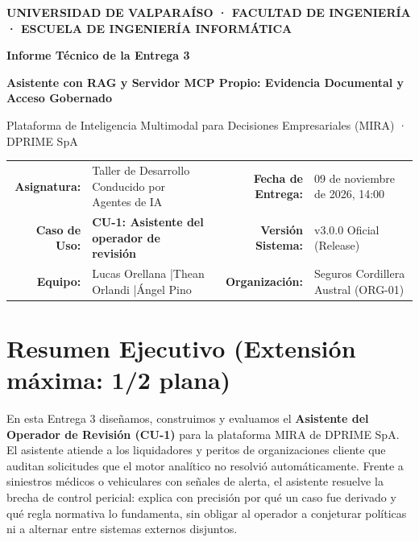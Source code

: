 \documentclass[11pt,letterpaper]{article}
\begin{document}
\begin{center}
    {\small\textbf{\color{gray}UNIVERSIDAD DE VALPARAÍSO · FACULTAD DE INGENIERÍA · ESCUELA DE INGENIERÍA INFORMÁTICA}\par}
    \vspace{0.2cm}
    {\Large\bfseries\color{dprimeblue}Informe Técnico de la Entrega 3\par}
    \vspace{0.1cm}
    {\large\bfseries\color{indigoaccent}Asistente con RAG y Servidor MCP Propio: Evidencia Documental y Acceso Gobernado\par}
    \vspace{0.1cm}
    {\normalsize Plataforma de Inteligencia Multimodal para Decisiones Empresariales (MIRA) · DPRIME SpA\par}
    \vspace{0.3cm}

    \small
    \begin{tabularx}{\textwidth}{rY rY}
        \toprule
        \textbf{Asignatura:} & Taller de Desarrollo Conducido por Agentes de IA & \textbf{Fecha de Entrega:} & 09 de noviembre de 2026, 14:00\\
        \textbf{Caso de Uso:} & \textbf{CU-1: Asistente del operador de revisión} & \textbf{Versión Sistema:} & v3.0.0 Oficial (Release)\\
        \textbf{Equipo:} & Lucas Orellana \quad|\quad Thean Orlandi \quad|\quad Ángel Pino & \textbf{Organización:} & Seguros Cordillera Austral (ORG-01)\\
        \bottomrule
    \end{tabularx}
\end{center}

\vspace{0.3cm}
\section{Resumen Ejecutivo (Extensión máxima: 1/2 plana)}
\vspace{-0.2cm}
En esta Entrega 3 diseñamos, construimos y evaluamos el \textbf{Asistente del Operador de Revisión (CU-1)} para la plataforma MIRA de DPRIME SpA. El asistente atiende a los liquidadores y peritos de organizaciones cliente que auditan solicitudes que el motor analítico no resolvió automáticamente. Frente a siniestros médicos o vehiculares con señales de alerta, el asistente resuelve la brecha de control pericial: explica con precisión por qué un caso fue derivado y qué regla normativa lo fundamenta, sin obligar al operador a conjeturar políticas ni a alternar entre sistemas externos disjuntos.
\end{document}
